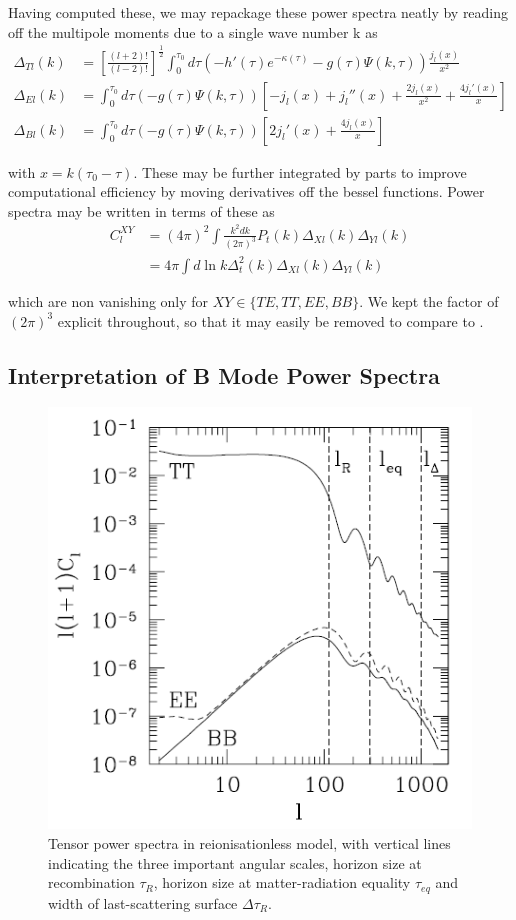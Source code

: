 \documentclass[a4paper,10pt]{article}
\newcommand{\half}{\frac{1}{2}}
\newcommand{\ltwo}{\left[\frac{(l+2)!}{(l-2)!}\right]}
\begin{document}
Having computed these, we may repackage these power spectra neatly by reading off the multipole moments due to a single wave number k as 
\begin{equation}
\begin{split}
\Delta_{Tl}(k) &= \ltwo^\half \int_0^{\tau_0} d\tau \left(-h'(\tau)e^{-\kappa(\tau)}-g(\tau)\Psi(k,\tau)\right)\frac{j_l(x)}{x^2}\\
\Delta_{El}(k) &= \int_0^{\tau_0}d\tau  \left(-g(\tau)\Psi(k,\tau)\right)\left[-j_l(x) +j_l''(x)+\frac{2j_l(x)}{x^2} + \frac{4j_l'(x)}{x}\right]\\
\Delta_{Bl}(k) &= \int_0^{\tau_0} d\tau \left(-g(\tau)\Psi(k,\tau)\right)\left[2j_l'(x)+\frac{4j_l(x)}{x}\right]
\end{split}
\end{equation}
 
with $x=k(\tau_0-\tau)$. These may be further integrated by parts to improve computational efficiency by moving derivatives off the bessel functions. Power spectra may be written in terms of these as 
\begin{equation}
\begin{split}
C_l^{XY} &= (4\pi)^2 \int \frac{k^2dk}{(2\pi)^3} P_t(k) \Delta_{Xl}(k)\Delta_{Yl}(k)\\
 &= 4\pi\int d\ln k \Delta^2_t(k) \Delta_{Xl}(k)\Delta_{Yl}(k)
\end{split}
\end{equation}

which are non vanishing only for $XY \in \{TE, TT, EE, BB\}$. We kept the factor of $(2\pi)^3$ explicit throughout, so that it may easily be removed to compare to \cite{all-sky}.  

\subsection{Interpretation of B Mode Power Spectra}
\label{interpretation}
\begin{figure}[h]
  \includegraphics[width=0.5\linewidth]{tensorpowerspectra.png}
  \centering
  \caption{Tensor power spectra in reionisationless model, with vertical lines indicating the three important angular scales, horizon size at recombination $\tau_R$, horizon size at matter-radiation equality $\tau_{eq}$ and width of last-scattering surface $\Delta\tau_R$.}
  \label{tensorpower}
\end{figure}
\end{document}
